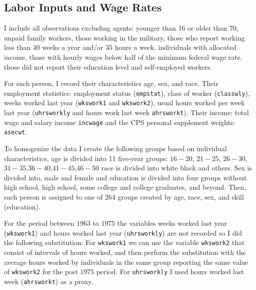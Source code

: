 \documentclass[12pt]{article}
\begin{document}

\subsection{Labor Inputs and Wage Rates}\label{subsec:labor-inputs-wage-rates}
I include all observations excluding agents: younger than $16$ or older than $70$, unpaid family workers, those working in the military, those who report working less than $40$ weeks a year and/or $35$ hours a week, individuals with allocated income, those with hourly wages below half of the minimum federal wage rate, those did not report their education level and self-employed workers.

For each person, I record their characteristics age, sex, and race. Their employment statistics: employment status (\texttt{empstat}), class of worker (\texttt{classwly}), weeks worked last year (\texttt{wkswork1} and \texttt{wkswork2}), usual hours worked per week last year (\texttt{uhrsworkly} and hours work last week \texttt{ahrsworkt}). Their income: total wage and salary income \texttt{incwage} and the CPS personal supplement weights: \texttt{asecwt}.

To homogenize the data I create the following groups based on individual characteristics, age is divided into 11 five-year groups: $16-20$, $21-25$, $26-30$, $31-35$,$36-40$,$41-45$,$46-50$ race is divided into white black and others. Sex is divided into, male and female and education is divided into four groups without high school, high school, some college and college graduates, and beyond. Then, each person is assigned to one of 264 groups created by age, race, sex, and skill (education).

For the period between $1963$ to $1975$ the variables weeks worked last year (\texttt{wkswork1}) and hours worked last year (\texttt{uhrsworkly}) are not recorded so I did the following substitution: For \texttt{wkswork1} we can use the variable \texttt{wkswork2} that consist of intervals of hours worked, and then perform the substitution with the average hours worked by individuals in the same group reporting the same value of \texttt{wkswork2} for the post $1975$ period. For \texttt{uhrsworkly} I used hours worked last week (\texttt{ahrsworkt}) as a proxy.
\end{document}
